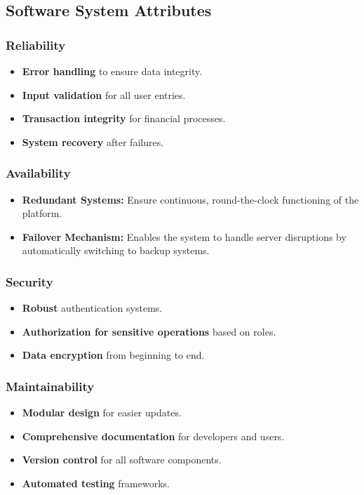 \newpage
\subsection{Software System Attributes}
\label{subsec:software_system_attributes}

\subsubsection*{Reliability}
\begin{itemize}
    \item \textbf{Error handling} to ensure data integrity.
    \item \textbf{Input validation} for all user entries.
    \item \textbf{Transaction integrity} for financial processes.
    \item \textbf{System recovery} after failures.
\end{itemize}

\subsubsection*{Availability}
\begin{itemize}
    \item \textbf{Redundant Systems:} Ensure continuous, round-the-clock functioning of the platform.
    \item \textbf{Failover Mechanism:} Enables the system to handle server disruptions by automatically switching to backup systems.
\end{itemize}

\subsubsection*{Security}
\begin{itemize}
    \item \textbf{Robust} authentication systems.
    \item \textbf{Authorization for sensitive operations} based on roles.
    \item \textbf{Data encryption} from beginning to end.
\end{itemize}

\subsubsection*{Maintainability}
\begin{itemize}
    \item \textbf{Modular design} for easier updates.
    \item \textbf{Comprehensive documentation} for developers and users.
    \item \textbf{Version control} for all software components.
    \item \textbf{Automated testing} frameworks.
\end{itemize}

